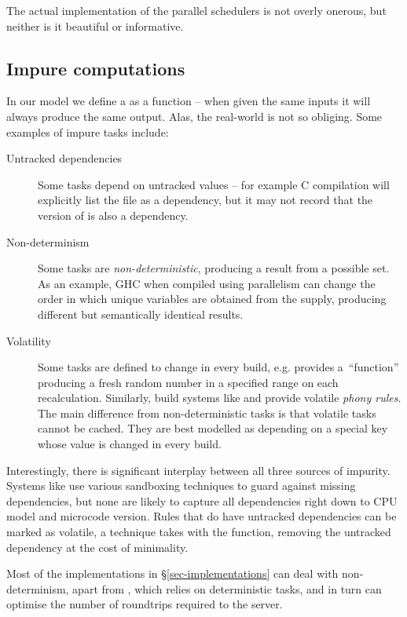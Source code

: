 The actual implementation of the parallel schedulers is not overly onerous,
but neither is it beautiful or informative.

\subsection{Impure computations}\label{sec-non-determinism}

In our model we define a  as a function -- when given the same inputs
it will always produce the same output. Alas, the real-world is not so obliging.
Some examples of impure tasks include:

\begin{description}
\item[Untracked dependencies] Some tasks depend on untracked values -- for example
C compilation will explicitly list the  file as a dependency,
but it may not record that the version of  is also a dependency.

\item[Non-determinism] Some tasks are \emph{non-deterministic}, producing a
result from a possible set. As an example, GHC when compiled using parallelism
can change the order in which unique variables are obtained from the supply,
producing different but semantically identical results.

\item[Volatility] Some tasks are defined to change in every build, e.g. \Excel
provides a~``function''  producing a fresh random number in a
specified range on each recalculation. Similarly, build systems like \Make and
\Shake provide volatile \emph{phony rules}. The main difference from
non-deterministic tasks is that volatile tasks cannot be cached. They are best
modelled as depending on a special key  whose value is changed
in every build.
\end{description}

Interestingly, there is significant interplay between all three sources of
impurity. Systems like \Bazel use various sandboxing techniques to guard against
missing dependencies, but none are likely to capture all dependencies right down
to CPU model and microcode version. Rules that do have untracked dependencies can be
marked as volatile, a technique \Excel takes with the  function,
removing the untracked dependency at the cost of minimality.

Most of the implementations in \S\ref{sec-implementations} can deal with
non-determinism, apart from \Buck, which relies on deterministic tasks, and
in turn can optimise the number of roundtrips required to the server.

